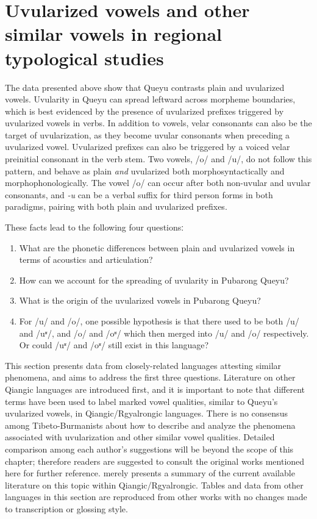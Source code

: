 \documentclass[output=paper]{langscibook}
\begin{document}
\section{Uvularized vowels and other similar vowels in regional typological studies}\label{sec:guan:3}

The data presented above show that Queyu contrasts plain and uvularized vowels. Uvularity in Queyu can spread leftward across morpheme boundaries, which is best evidenced by the presence of uvularized prefixes triggered by uvularized vowels in verbs. In addition to vowels, velar consonants can also be the target of uvularization, as they become uvular consonants when preceding a uvularized vowel. Uvularized prefixes can also be triggered by a voiced velar preinitial consonant in the verb stem. Two vowels, /o/ and /u/, do not follow this pattern, and behave as plain \textit{and} uvularized both morphosyntactically and morphophonologically. The vowel /o/ can occur after both non-uvular and uvular consonants, and \textit{{}-u} can be a verbal suffix for third person forms in both paradigms, pairing with both plain and uvularized prefixes.

These facts lead to the following four questionsː 

\begin{enumerate}
\item What are the phonetic differences between plain and uvularized vowels in terms of acoustics and articulation? 
\item How can we account for the spreading of uvularity in Pubarong Queyu?
\item What is the origin of the uvularized vowels in Pubarong Queyu? 
\item For /u/ and /o/, one possible hypothesis is that there used to be both /u/ and /uʶ/, and /o/ and /oʶ/ which then merged into /u/ and /o/ respectively. Or could /uʶ/ and /oʶ/ still exist in this language? 
\end{enumerate}

This section presents data from closely-related languages attesting similar phenomena, and aims to address the first three questions. Literature on other Qiangic languages are introduced first, and it is important to note that different terms have been used to label marked vowel qualities, similar to Queyu’s uvularized vowels, in Qiangic/Rgyalrongic languages. There is no consensus among Tibeto-Burmanists about how to describe and analyze the phenomena associated with uvularization and other similar vowel qualities. Detailed comparison among each author’s suggestions will be beyond the scope of this chapter; therefore readers are suggested to consult the original works mentioned here for further reference.  merely presents a summary of the current available literature on this topic within Qiangic/Rgyalrongic. Tables and data from other languages in this section are reproduced from other works with no changes made to transcription or glossing style.
\end{document}
